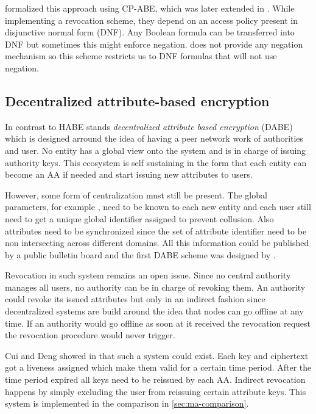 \cite{Wang:2010:HAE:1866307.1866414} formalized this approach using \ac{CP-ABE}, which was later extended in \cite{wang2011hierarchical}. While implementing a revocation scheme, they depend on an access policy present in disjunctive normal form (\ac{DNF}). Any Boolean formula can be transferred into DNF but sometimes this might enforce negation. \cite{wang2011hierarchical} does not provide any negation mechanism so this scheme restricts us to DNF formulas that will not use negation.  

\subsection{Decentralized attribute-based encryption}
\label{sec:DABE}
In contrast to HABE stands \textit{decentralized attribute based encryption} (\ac{DABE}) which is designed arround the idea of having a peer network work of authorities and user. No entity has a global view onto the system and is in charge of issuing authority keys. This ecosystem is self sustaining in the form that each entity can become an \ac{AA} if needed and start issuing new attributes to users. 

However, some form of centralization must still be present. The global parameters, for example , need to be known to each new entity and each user still need to get a unique global identifier assigned to prevent collusion. Also attributes need to be synchronized since the set of attribute identifier need to be non intersecting across different domains. All this information could be published by a public bulletin board and the first DABE scheme was designed by \cite{lewko2011decentralizing}. 

Revocation in such system remains an open issue. Since no central authority manages all users, no authority can be in charge of revoking them. An authority could revoke its issued attributes but only in an indirect fashion since decentralized systems are build around the idea that nodes can go offline at any time. If an authority would go offline as soon at it received the revocation request the revocation procedure would never trigger. 

Cui and Deng showed in \cite{cui2016revocable} that such a system could exist. Each key and ciphertext got a liveness assigned which make them valid for a certain time period. After the time period expired all keys need to be reissued by each \ac{AA}. Indirect revocation happens by simply excluding the user from reissuing certain attribute keys. This system is implemented in the comparison in \ref{sec:ma-comparison}.

